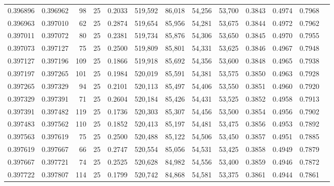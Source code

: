 \begin{tabular}{rrrrrrrrrrrrr}
0.396896 & 0.396962 &    98 &  25 &                                     0.2033 & 519,592 &  86,018 &  54,256 &  53,700 & 0.3843 & 0.4974 & 0.7968 \\
0.396963 & 0.397010 &    62 &  25 &                                     0.2874 & 519,654 &  85,956 &  54,281 &  53,675 & 0.3844 & 0.4972 & 0.7962 \\
0.397011 & 0.397072 &    80 &  25 &                                     0.2381 & 519,734 &  85,876 &  54,306 &  53,650 & 0.3845 & 0.4970 & 0.7955 \\
0.397073 & 0.397127 &    75 &  25 &                                     0.2500 & 519,809 &  85,801 &  54,331 &  53,625 & 0.3846 & 0.4967 & 0.7948 \\
0.397127 & 0.397196 &   109 &  25 &                                     0.1866 & 519,918 &  85,692 &  54,356 &  53,600 & 0.3848 & 0.4965 & 0.7938 \\
0.397197 & 0.397265 &   101 &  25 &                                     0.1984 & 520,019 &  85,591 &  54,381 &  53,575 & 0.3850 & 0.4963 & 0.7928 \\
0.397265 & 0.397329 &    94 &  25 &                                     0.2101 & 520,113 &  85,497 &  54,406 &  53,550 & 0.3851 & 0.4960 & 0.7920 \\
0.397329 & 0.397391 &    71 &  25 &                                     0.2604 & 520,184 &  85,426 &  54,431 &  53,525 & 0.3852 & 0.4958 & 0.7913 \\
0.397391 & 0.397482 &   119 &  25 &                                     0.1736 & 520,303 &  85,307 &  54,456 &  53,500 & 0.3854 & 0.4956 & 0.7902 \\
0.397483 & 0.397562 &   110 &  25 &                                     0.1852 & 520,413 &  85,197 &  54,481 &  53,475 & 0.3856 & 0.4953 & 0.7892 \\
0.397563 & 0.397619 &    75 &  25 &                                     0.2500 & 520,488 &  85,122 &  54,506 &  53,450 & 0.3857 & 0.4951 & 0.7885 \\
0.397619 & 0.397667 &    66 &  25 &                                     0.2747 & 520,554 &  85,056 &  54,531 &  53,425 & 0.3858 & 0.4949 & 0.7879 \\
0.397667 & 0.397721 &    74 &  25 &                                     0.2525 & 520,628 &  84,982 &  54,556 &  53,400 & 0.3859 & 0.4946 & 0.7872 \\
0.397722 & 0.397807 &   114 &  25 &                                     0.1799 & 520,742 &  84,868 &  54,581 &  53,375 & 0.3861 & 0.4944 & 0.7861 \\

\end{tabular}
